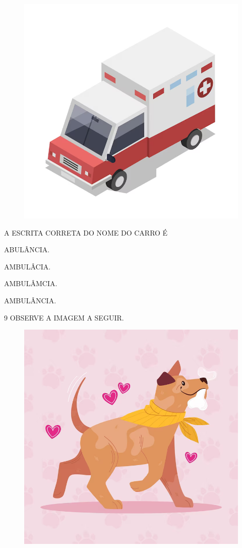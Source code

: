 \begin{figure}[H]
\centering
\includegraphics[width=\textwidth]{./media/image225.png}
\end{figure}

A ESCRITA CORRETA DO NOME DO CARRO É

\begin{escolha}

\item ABULÂNCIA.

\item AMBULÂCIA.

\item AMBULÂMCIA.

\item AMBULÂNCIA.

\end{escolha}

\num{9} OBSERVE A IMAGEM A SEGUIR.

\begin{figure}[H]
\centering
\includegraphics[width=.7\textwidth]{./media/image226.png}
\end{figure}

